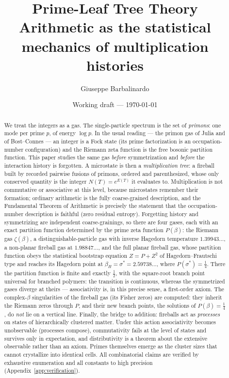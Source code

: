\documentclass[11pt]{article}
\title{Prime-Leaf Tree Theory\\[2mm]
\large Arithmetic as the statistical mechanics of multiplication histories}
\author{Giuseppe Barbalinardo}
\date{Working draft --- \today}
\numberwithin{equation}{section}
\theoremstyle{plain}
\theoremstyle{definition}
\theoremstyle{remark}
\begin{document}
\maketitle

\begin{abstract}
We treat the integers as a gas. The single-particle spectrum is the set of
\emph{primons}: one mode per prime $p$, of energy $\log p$. In the usual reading ---
the primon gas of Julia and of Bost--Connes --- an integer is a Fock state (its prime
factorization is an occupation-number configuration) and the Riemann zeta function is
the free bosonic partition function. This paper studies the same gas \emph{before}
symmetrization and \emph{before} the interaction history is forgotten. A microstate is
then a \emph{multiplication tree}: a fireball built by recorded pairwise fusions of
primons, ordered and parenthesized, whose only conserved quantity is the integer
$N(T) = e^{E(T)}$ it evaluates to. Multiplication is not commutative or associative at
this level, because microstates remember their formation; ordinary arithmetic is the
fully coarse-grained description, and the Fundamental Theorem of Arithmetic is
precisely the statement that the occupation-number description is faithful (zero
residual entropy). Forgetting history and symmetrizing are independent
coarse-grainings, so there are four gases, each with an exact partition function
determined by the prime zeta function $P(\beta)$: the Riemann gas $\zeta(\beta)$, a
distinguishable-particle gas with inverse Hagedorn temperature $1.39943\dots$, a
non-planar fireball gas at $1.98847\dots$, and the full planar fireball gas, whose
partition function obeys the statistical bootstrap equation $Z = P + Z^2$ of
Hagedorn--Frautschi type and reaches its Hagedorn point at
$\beta_H = \sigma^{*} = 2.59738\dots$, where $P(\sigma^{*}) = \tfrac14$. There the
partition function is finite and exactly $\tfrac12$, with the square-root branch point
universal for branched polymers: the transition is continuous, whereas the symmetrized
gases diverge at theirs --- associativity is, in this precise sense, a first-order
axiom. The complex-$\beta$ singularities of the fireball gas (its Fisher zeros) are
computed: they inherit the Riemann zeros through $P$, and their new branch points,
the solutions of $P(\beta) = \tfrac14$, do \emph{not} lie on a vertical line. Finally,
the bridge to addition: fireballs act as \emph{processes} on states of hierarchically
clustered matter. Under this action associativity becomes unobservable (processes
compose), commutativity fails at the level of states and survives only in expectation,
and distributivity is a theorem about the extensive observable rather than an axiom.
Primes themselves emerge as the cluster sizes that cannot crystallize into identical
cells. All combinatorial claims are verified by exhaustive enumeration and all
constants to high precision (Appendix~\ref{app:verification}).
\end{abstract}
\end{document}
